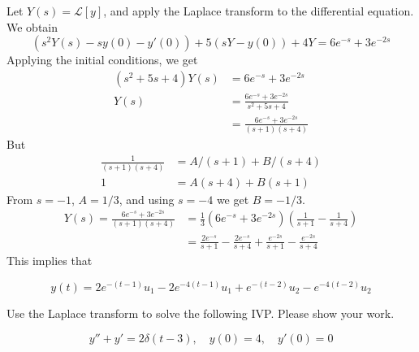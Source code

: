     \ifnum {} {\color{DarkBlue} 
    Let $Y (s) = \mathcal L[y]$, and apply the Laplace transform to the differential equation. We obtain
    $$\left(s^2 Y (s) - sy(0) - y' (0) \right)+ 5(sY-y(0)) + 4Y  = 6e^{-s} + 3e^{-2 s}$$
    Applying the initial conditions, we get
    \begin{align}(s^2 + 5s + 4)Y(s) &= 6e^{-s} + 3e^{-2s} \\
        Y(s) &=  \frac{ 6e^{- s} + 3e^{-2 s}}{s^2 + 5s + 4} \\
        &=  \frac{6e^{- s} +3e^{-2 s}}{(s+1)(s+4)} 
    \end{align}
    But 
    \begin{align}
        \frac{1}{(s+1)(s+4)} &= A/(s+1) + B/(s+4) \\
        1 &= A(s+4) + B(s+1) 
    \end{align}
    From $s=-1$, $A=1/3$, and using $s=-4$ we get $B=-1/3$. 
    \begin{align}
        Y(s) = \frac{ 6e^{- s} + 3e^{-2 s}}{(s+1)(s+4)} 
        &= \frac13 \left( 6e^{- s} + 3e^{-2 s}\right) \left( \frac{1}{s+1} - \frac{1}{s+4} \right) \\
        &=  \frac{2e^{- s}}{s+1} - \frac{2e^{- s}}{s+4} +  \frac{e^{-2 s}}{s+1} - \frac{e^{-2 s}}{s+4}     
    \end{align}    
    This implies that
    
    $$y(t) = 2e^{-(t-1)}u_1 - 2e^{-4(t-1)}u_1 + e^{-(t-2)}u_2 - e^{-4(t-2)}u_2$$ 
    
    } 
    \else 
    \fi
\fi


\ifnum {}
\ifnum {} \newpage \fi
\question[5] Use the Laplace transform to solve the following IVP. Please show your work. 

    $$ y''+ y' =  2\delta(t - 3), \quad y(0) = 4, \quad y'(0) = 0$$  

